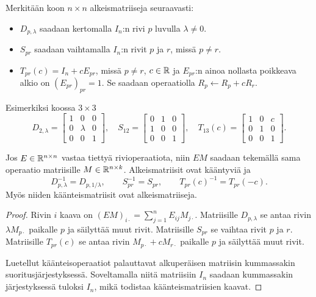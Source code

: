 \documentclass[11pt,a4paper]{amsart}
\begin{document}
  Merkitään koon $n\times n$ alkeismatriiseja seuraavasti:
  \begin{itemize}
    \item $D_{p,\lambda}$ saadaan kertomalla $I_n$:n rivi $p$ luvulla
      $\lambda\ne0$.
    \item $S_{pr}$ saadaan vaihtamalla $I_n$:n rivit $p$ ja $r$,
      missä $p\ne r$.
    \item $T_{pr}(c)=I_n+cE_{pr}$, missä $p\ne r$, $c\in\mathbb{R}$ ja
      $E_{pr}$:n ainoa nollasta poikkeava alkio on
      $(E_{pr})_{pr}=1$. Se saadaan operaatiolla $R_p\leftarrow R_p+cR_r$.
  \end{itemize}
  Esimerkiksi koossa $3\times3$
  \[
    D_{2,\lambda}=
    \begin{bmatrix}1&0&0\\0&\lambda&0\\0&0&1
    \end{bmatrix},
    \quad S_{12}=
    \begin{bmatrix}0&1&0\\1&0&0\\0&0&1
    \end{bmatrix},
    \quad T_{13}(c)=
    \begin{bmatrix}1&0&c\\0&1&0\\0&0&1
    \end{bmatrix}.
  \]

  \begin{lemma}\label{lem:elementary-rows}
    Jos $E\in\mathbb{R}^{n\times n}$ vastaa tiettyä rivioperaatiota, niin
    $EM$ saadaan tekemällä sama operaatio matriisille
    $M\in\mathbb{R}^{n\times k}$. Alkeismatriisit ovat kääntyviä ja
    \[
      D_{p,\lambda}^{-1}=D_{p,1/\lambda},\qquad
      S_{pr}^{-1}=S_{pr},\qquad T_{pr}(c)^{-1}=T_{pr}(-c).
    \]
    Myös niiden käänteismatriisit ovat alkeismatriiseja.
  \end{lemma}
  \begin{proof}
    Rivin $i$ kaava on $(EM)_{i\cdot}=\sum_{j=1}^n E_{ij}M_{j\cdot}$.
    Matriisille $D_{p,\lambda}$ se antaa rivin $\lambda M_{p\cdot}$
    paikalle $p$ ja säilyttää muut rivit. Matriisille $S_{pr}$ se
    vaihtaa rivit $p$ ja $r$. Matriisille $T_{pr}(c)$ se antaa rivin
    $M_{p\cdot}+cM_{r\cdot}$ paikalle $p$ ja säilyttää muut rivit.

    Luetellut käänteisoperaatiot palauttavat alkuperäisen matriisin
    kummassakin suoritusjärjestyksessä. Soveltamalla niitä matriisiin
    $I_n$ saadaan kummassakin järjestyksessä tuloksi $I_n$, mikä
    todistaa käänteismatriisien kaavat.
  \end{proof}
\end{document}
